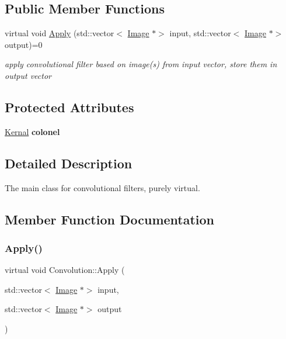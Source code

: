 \subsection*{Public Member Functions}
\begin{DoxyCompactItemize}
\item 
virtual void \hyperlink{classConvolution_ad18fa18c52d8156b82b97bcfebbdaf85}{Apply} (std\+::vector$<$ \hyperlink{classImage}{Image} $\ast$$>$ input, std\+::vector$<$ \hyperlink{classImage}{Image} $\ast$$>$ output)=0
\begin{DoxyCompactList}\small\item\em apply convolutional filter based on image(s) from input vector, store them in output vector \end{DoxyCompactList}\end{DoxyCompactItemize}
\subsection*{Protected Attributes}
\begin{DoxyCompactItemize}
\item 
\mbox{\label{classConvolution_acd84785d396338662bc860668add539f}} 
\hyperlink{classKernal}{Kernal} {\bfseries colonel}
\end{DoxyCompactItemize}


\subsection{Detailed Description}
The main class for convolutional filters, purely virtual. 

\subsection{Member Function Documentation}
\mbox{\label{classConvolution_ad18fa18c52d8156b82b97bcfebbdaf85}} 
\subsubsection{\texorpdfstring{Apply()}{Apply()}}
{\footnotesize\ttfamily virtual void Convolution\+::\+Apply (\begin{DoxyParamCaption}\item[{std\+::vector$<$ \hyperlink{classImage}{Image} $\ast$$>$}]{input,  }\item[{std\+::vector$<$ \hyperlink{classImage}{Image} $\ast$$>$}]{output }\end{DoxyParamCaption})\hspace{0.3cm}{\ttfamily [pure virtual]}}



